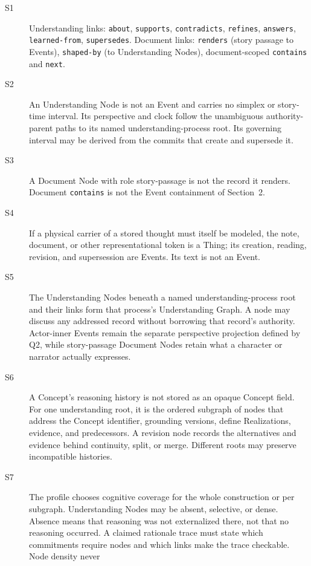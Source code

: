 \documentclass[11pt,a4paper]{article}
\begin{document}
\begin{description}
  \item[S1] Understanding links: \texttt{about}, \texttt{supports},
    \texttt{contradicts}, \texttt{refines}, \texttt{answers},
    \texttt{learned-from}, \texttt{supersedes}. Document links:
    \texttt{renders} (story passage to Events), \texttt{shaped-by} (to Understanding Nodes),
    document-scoped \texttt{contains} and \texttt{next}.
  \item[S2] An Understanding Node is not an Event and carries no simplex or
    story-time interval. Its perspective and clock follow the unambiguous
    authority-parent paths to its named understanding-process root. Its
    governing interval may be derived from the commits that create and
    supersede it.
  \item[S3] A Document Node with role \textsf{story-passage} is not the record
    it renders. Document
    \texttt{contains} is not the Event containment of Section~2.
  \item[S4] If a physical carrier of a stored thought must itself be modeled,
    the note, document, or other representational token is a Thing; its creation, reading, revision,
    and supersession are Events. Its text is not an Event.
  \item[S5] The Understanding Nodes beneath a named understanding-process root
    and their links form that process's Understanding Graph. A node may discuss
    any addressed record without borrowing that record's authority. Actor-inner
    Events remain the separate perspective projection defined by Q2, while
    story-passage Document Nodes retain what a character or narrator actually
    expresses.
  \item[S6] A Concept's reasoning history is not stored as an opaque Concept
    field. For one understanding root, it is the ordered subgraph of nodes that
    address the Concept identifier, grounding versions, \textsf{define}
    Realizations, evidence, and predecessors. A revision node records the
    alternatives and evidence behind continuity, split, or merge. Different
    roots may preserve incompatible histories.
  \item[S7] The profile chooses cognitive coverage for the whole construction
    or per subgraph. Understanding Nodes may be absent, selective, or dense.
    Absence means that reasoning was not externalized there, not that no
    reasoning occurred. A claimed rationale trace must state which commitments
    require nodes and which links make the trace checkable. Node density never

\end{description}
\end{document}
